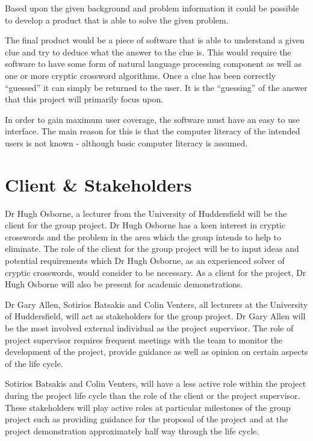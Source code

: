 Based upon the given background and problem information it could be possible to
develop a product that is able to solve the given problem.

The final product would be a piece of software that is able to understand a
given clue and try to deduce what the answer to the clue is. This would require
the software to have some form of natural language processing component as well
as one or more cryptic crossword algorithms. Once a clue has been correctly
``guessed'' it can simply be returned to the user. It is the ``guessing'' of
the answer that this project will primarily focus upon.

In order to gain maximum user coverage, the software must have an easy to use
interface. The main reason for this is that the computer literacy of the
intended users is not known - although basic computer literacy is assumed.


\section{Client \& Stakeholders}

Dr Hugh Osborne, a lecturer from the University of Huddersfield will be  the
client for the group project. Dr Hugh Osborne has a keen interest in cryptic
crosswords and the problem in the area which the group intends to help to
eliminate. The role of the client for the group project will be to input ideas
and potential requirements which Dr Hugh Osborne, as an experienced solver of
cryptic crosswords, would consider to be necessary. As a client for the project,
Dr Hugh Osborne will also be present for academic demonstrations.

Dr Gary Allen, Sotirios Batsakis and Colin Venters, all lecturers at the
University of Huddersfield, will act as stakeholders for the group project. Dr
Gary Allen will be the most involved external individual as the project
supervisor. The role of project supervisor requires frequent meetings with the
team to monitor the development of the project, provide guidance as well as
opinion on certain aspects of the life cycle.

Sotirios Batsakis and Colin Venters, will have a less active role within the
project during the project life cycle than the role of the client or the project
supervisor.  These stakeholders will play active roles at particular milestones
of the group  project such as providing guidance for the proposal of the project
and at the  project demonstration approximately half way through the life cycle.



